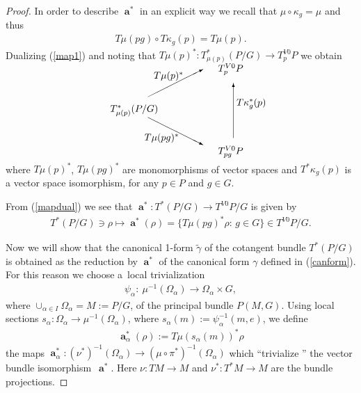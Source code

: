 \documentclass[pdftex]{sigma}
\renewcommand{\to}{\rightarrow}
\DeclareMathOperator{\anch}{\mathbf{a}}
\newcommand{\tbp}{\nu} %
\numberwithin{equation}{section}
\begin{document}
\begin{proof}In order to describe $\anch^*$ in an explicit way we recall that $\mu\circ\kappa_g=\mu$ and thus
\begin{gather}\label{map1}
T\mu(pg)\circ T\kappa_g(p)=T\mu(p).
\end{gather}
Dualizing (\ref{map1}) and noting that $T\mu(p)^*\colon T_{\mu(p)}^*(P/G)\to T^{V0}_p P$ we obtain
\begin{gather}\label{mapdual}\begin{split}& \unitlength=5mm \begin{picture}(11,6)(-1.5,0)
 \put(1,3){\makebox(0,0){$T_{\mu(p)}^*(P/G)$}}
 \put(8,6){\makebox(0,0){$T^{V0}_p P$}}
 \put(8,0){\makebox(0,0){$T^{V0}_{pg} P$}}
 \put(2,4){\vector(2,1){4}}
 \put(8.2,1){\vector(0,1){4}}
 \put(2,2.5){\vector(2,-1){4}}
 \put(2.2,3.4){\makebox(0,0){$\ $}}
 \put(9.1,3.4){\makebox(0,0){$\ $}}
 \put(9.5,3.5){\makebox(0,0){$T\kappa_g^*(p)$}}
 \put(3.5,5.5){\makebox(0,0){$T\mu(p)^*$}}
 \put(3,1){\makebox(0,0){$T\mu(pg)^*$}}
\end{picture}\end{split}\end{gather}
where $T\mu(p)^*$, $T\mu(pg)^*$ are monomorphisms of vector spaces and $T^*\kappa_g(p)$ is a vector space isomorphism, for any $p\in P$ and $g\in G$.

From (\ref{mapdual}) we see that $\anch^*\colon T^*(P/G)\to T^{V0}P/G$ is given by
\begin{gather*}%
T^*(P/G)\ni \rho\mapsto \anch^*(\rho)=\{T\mu(pg)^*\rho\colon \, g\in G\}\in T^{V0}P/G.
\end{gather*}

Now we will show that the canonical 1-form $\tilde\gamma$ of the cotangent bundle $T^*(P/G)$ is obtained as the reduction by $\anch^*$ of the canonical form $\gamma$ def\/ined in (\ref{canform}). For this reason we choose a~local trivialization
\begin{gather*}%
\psi_\alpha\colon \ \mu^{-1}(\Omega_\alpha)\to \Omega_\alpha\times G,\end{gather*}
where $\cup_{\alpha\in I}\Omega_\alpha=M:=P/G$, of the principal bundle $P(M,G)$. Using local sections $s_\alpha\colon \Omega_\alpha\to \mu^{-1}(\Omega_\alpha)$, where $s_\alpha(m):=\psi^{-1}_\alpha(m,e)$, we def\/ine
\begin{gather*}
\anch^*_\alpha(\rho):=T\mu(s_\alpha(m))^*\rho
\end{gather*}
the maps $\anch^*_\alpha\colon (\tbp^*)^{-1}(\Omega_\alpha)\to (\mu\circ \pi^*)^{-1}(\Omega_\alpha)$ which ``trivialize '' the vector bundle isomorphism~$\anch^*$. Here $\nu\colon TM\to M$ and $\nu^*\colon T^*M\to M$ are the bundle projections.


\end{proof}
\end{document}
